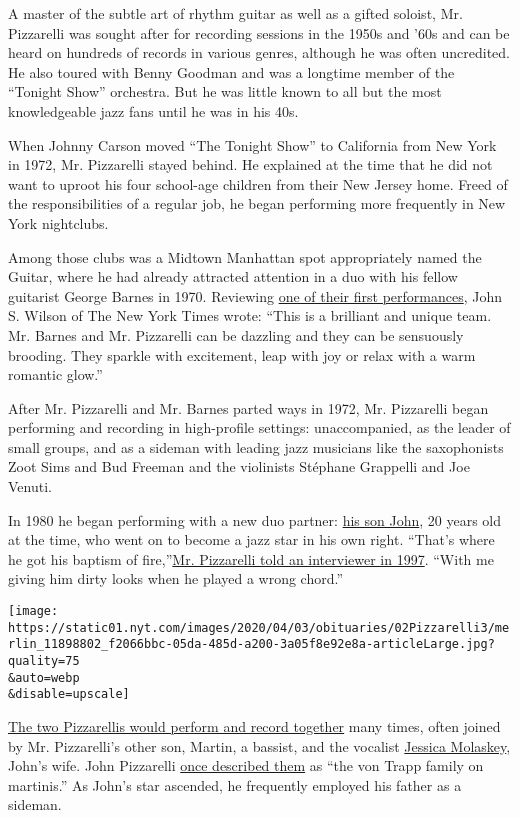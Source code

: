 A master of the subtle art of rhythm guitar as well as a gifted soloist,
Mr. Pizzarelli was sought after for recording sessions in the 1950s and
'60s and can be heard on hundreds of records in various genres, although
he was often uncredited. He also toured with Benny Goodman and was a
longtime member of the ``Tonight Show'' orchestra. But he was little
known to all but the most knowledgeable jazz fans until he was in his
40s.

When Johnny Carson moved ``The Tonight Show'' to California from New
York in 1972, Mr. Pizzarelli stayed behind. He explained at the time
that he did not want to uproot his four school-age children from their
New Jersey home. Freed of the responsibilities of a regular job, he
began performing more frequently in New York nightclubs.

Among those clubs was a Midtown Manhattan spot appropriately named the
Guitar, where he had already attracted attention in a duo with his
fellow guitarist George Barnes in 1970. Reviewing
\href{https://www.nytimes.com/1970/10/09/archives/a-jazz-guitar-duo-shows-virtuosity-bucky-pizzarelli-becomes-partner.html}{one
of their first performances}, John S. Wilson of The New York Times
wrote: ``This is a brilliant and unique team. Mr. Barnes and Mr.
Pizzarelli can be dazzling and they can be sensuously brooding. They
sparkle with excitement, leap with joy or relax with a warm romantic
glow.''

After Mr. Pizzarelli and Mr. Barnes parted ways in 1972, Mr. Pizzarelli
began performing and recording in high-profile settings: unaccompanied,
as the leader of small groups, and as a sideman with leading jazz
musicians like the saxophonists Zoot Sims and Bud Freeman and the
violinists Stéphane Grappelli and Joe Venuti.

In 1980 he began performing with a new duo partner:
\href{http://www.johnpizzarelli.com/}{his son John}, 20 years old at the
time, who went on to become a jazz star in his own right. ``That's where
he got his baptism of
fire,''\href{https://www.youtube.com/watch?v=dtwdk8VTyx4\&t=2897s}{Mr.
Pizzarelli told an interviewer in 1997}. ``With me giving him dirty
looks when he played a wrong chord.''

\texttt{[image: https://static01.nyt.com/images/2020/04/03/obituaries/02Pizzarelli3/merlin\_11898802\_f2066bbc-05da-485d-a200-3a05f8e92e8a-articleLarge.jpg?quality=75\\\&auto=webp\\\&disable=upscale]}

\href{https://www.youtube.com/watch?v=36UBSUodBeg}{The two Pizzarellis
would perform and record together} many times, often joined by Mr.
Pizzarelli's other son, Martin, a bassist, and the vocalist
\href{http://www.jessicamolaskey.com/}{Jessica Molaskey}, John's wife.
John Pizzarelli
\href{https://www.nytimes.com/2004/06/08/arts/the-family-that-plays-together-has-an-improbably-good-time.html}{once
described them} as ``the von Trapp family on martinis.'' As John's star
ascended, he frequently employed his father as a sideman.

